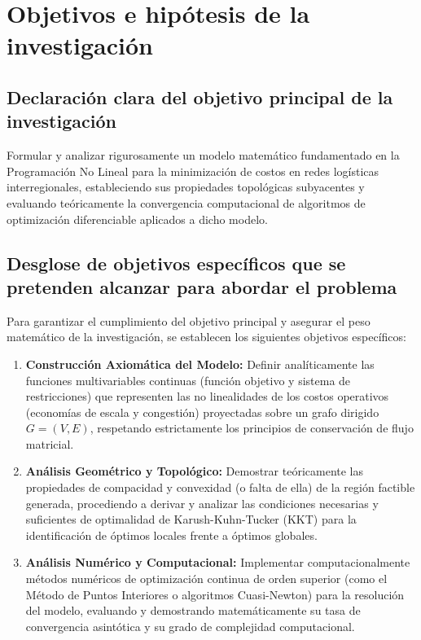\section{Objetivos e hipótesis de la investigación}

\subsection{Declaración clara del objetivo principal de la investigación}
Formular y analizar rigurosamente un modelo matemático fundamentado en la Programación No Lineal para la minimización de costos en redes logísticas interregionales, estableciendo sus propiedades topológicas subyacentes y evaluando teóricamente la convergencia computacional de algoritmos de optimización diferenciable aplicados a dicho modelo.

\subsection{Desglose de objetivos específicos que se pretenden alcanzar para abordar el problema}
Para garantizar el cumplimiento del objetivo principal y asegurar el peso matemático de la investigación, se establecen los siguientes objetivos específicos:

\begin{enumerate}
    \item \textbf{Construcción Axiomática del Modelo:} Definir analíticamente las funciones multivariables continuas (función objetivo y sistema de restricciones) que representen las no linealidades de los costos operativos (economías de escala y congestión) proyectadas sobre un grafo dirigido $G = (V, E)$, respetando estrictamente los principios de conservación de flujo matricial.
    
    \item \textbf{Análisis Geométrico y Topológico:} Demostrar teóricamente las propiedades de compacidad y convexidad (o falta de ella) de la región factible generada, procediendo a derivar y analizar las condiciones necesarias y suficientes de optimalidad de Karush-Kuhn-Tucker (KKT) para la identificación de óptimos locales frente a óptimos globales.
    
    \item \textbf{Análisis Numérico y Computacional:} Implementar computacionalmente métodos numéricos de optimización continua de orden superior (como el Método de Puntos Interiores o algoritmos Cuasi-Newton) para la resolución del modelo, evaluando y demostrando matemáticamente su tasa de convergencia asintótica y su grado de complejidad computacional.
\end{enumerate}

